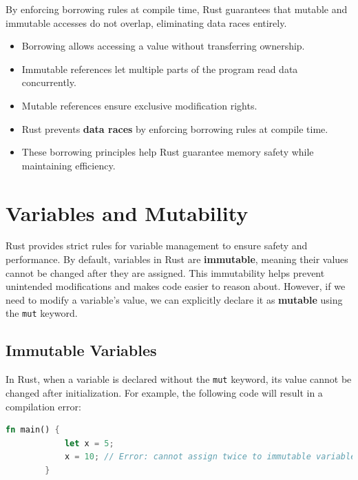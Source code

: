 \documentclass[a4paper,12pt]{report}
\begin{document}
	By enforcing borrowing rules at compile time, Rust guarantees that mutable and immutable accesses do not overlap, eliminating data races entirely.
	
\begin{takeawaybox}
	\begin{itemize}
		
		\item Borrowing allows accessing a value without transferring ownership.
		\item Immutable references let multiple parts of the program read data concurrently.
		\item Mutable references ensure exclusive modification rights.
		\item  Rust prevents \textbf{data races} by enforcing borrowing rules at compile time.
		\item  These borrowing principles help Rust guarantee memory safety while maintaining efficiency.
		
	\end{itemize}
\end{takeawaybox}
	
	
	
	\section{Variables and Mutability}
	
	
	Rust provides strict rules for variable management to ensure safety and performance. By default, variables in Rust are \textbf{immutable}, meaning their values cannot be changed after they are assigned. This immutability helps prevent unintended modifications and makes code easier to reason about. However, if we need to modify a variable’s value, we can explicitly declare it as \textbf{mutable} using the \texttt{mut} keyword.
	
	\subsection*{Immutable Variables}
	In Rust, when a variable is declared without the \texttt{mut} keyword, its value cannot be changed after initialization. For example, the following code will result in a compilation error:
	
	\begin{lstlisting}[language=Rust]
		fn main() {
			let x = 5;
			x = 10; // Error: cannot assign twice to immutable variable
		}
	\end{lstlisting}
	
\end{document}
